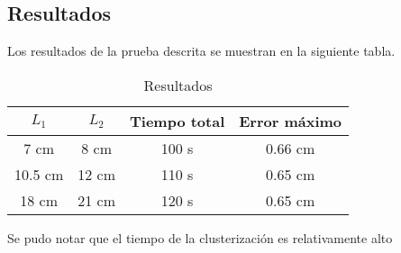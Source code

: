\subsection{Resultados}

Los resultados de la prueba descrita se muestran en la siguiente tabla.

\begin{table}[ht]
	\centering
	\begin{tabular}{|c|c|c|c|}
		\hline
		\textbf{$L_1$} & \textbf{$L_2$} & \textbf{Tiempo total} & \textbf{Error máximo} \\
		\hline
		7 cm  & 8 cm  & 100 s & 0.66 cm \\
		10.5 cm & 12 cm & 110 s & 0.65 cm \\
		18 cm  & 21 cm & 120 s & 0.65 cm \\
		\hline
	\end{tabular}
	\caption{Resultados}
\end{table}

Se pudo notar que el tiempo de la clusterización es relativamente alto